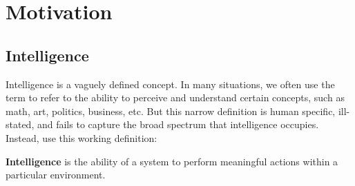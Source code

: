 \chapter{Motivation}

\section{Intelligence}

Intelligence is a vaguely defined concept. In many situations, we often use the term to refer to the ability to perceive and understand certain concepts, such as math, art, politics, business, etc. But this narrow definition is human specific, ill-stated, and fails to capture the broad spectrum that intelligence occupies. Instead, use this working definition:

\begin{center}
	\textbf{Intelligence} is the ability of a system to perform meaningful actions within a particular environment.
\end{center}

